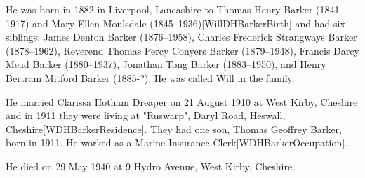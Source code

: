 
He was born in 1882 in Liverpool, Lancashire to Thomas Henry Barker (1841--1917) and Mary Ellen Moulsdale (1845--1936)[WillDHBarkerBirth] and had six siblings: James Denton Barker (1876--1958),  Charles Frederick Strangways Barker (1878--1962), Reverend Thomas Percy Conyers Barker (1879--1948), Francis Darcy Mead Barker (1880--1937), Jonathan Tong Barker (1883--1950), and Henry Bertram Mitford Barker (1885-?). He was called Will in the family.

He married Clarissa Hotham Dreaper on 21 August 1910 at West Kirby, Cheshire and in 1911 they were living at  "Ruswarp", Daryl Road, Heswall, Cheshire[WDHBarkerResidence].  They had one son, Thomas Geoffrey Barker, born in 1911.  He worked as a Marine Insurance Clerk[WDHBarkerOccupation].

He died on 29 May 1940 at 9 Hydro Avenue, West Kirby, Cheshire.

